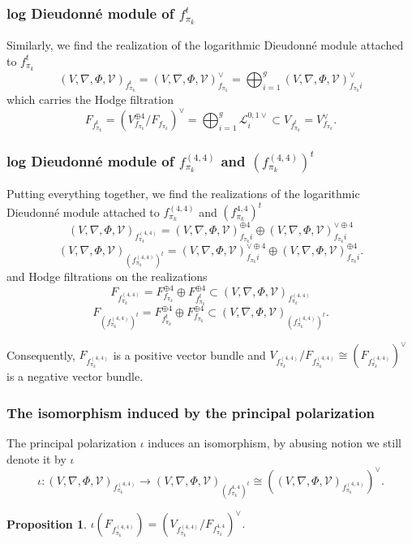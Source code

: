 \documentclass[12pt,twoside]{book}
\theoremstyle{plain}
\newtheorem{proposition}[proposition]{Proposition}
\theoremstyle{definition}
\theoremstyle{remark}
\newcommand{\mL}{{\mathcal L}}
\numberwithin{equation}{section}
\begin{document}
\subsubsection{log Dieudonn\'e module of $f^t_{\pi_k}$}
Similarly, we find the realization of the logarithmic Dieudonn\'e module attached to $f_{\pi_k}^t$
$$ (V,\nabla,\Phi,\mathcal V)_{f^t_{\pi_k}}=(V,\nabla,\Phi,\mathcal V)^\vee_{f_{\pi_k}}
=\bigoplus_{i=1}^g(V,\nabla,\Phi,\mathcal V)^\vee_{f_{\pi_k} i}$$
which carries the Hodge filtration
\[ F_{f^t_{\pi_k}} = (V_{f_{\pi_k}}^{\oplus 4}/ F_{f_{\pi_k}})^\vee= \bigoplus_{i=1}^g \mL_i^{0,1\vee} \subset V_{f^t_{\pi_k}} = V^\vee_{f_{\pi_k}} .\]

\subsubsection{log Dieudonn\'e module of $f^{(4,4)}_{\pi_k}$ and $(f^{(4,4)}_{\pi_k})^t$}
Putting everything together, we find the realizations of the logarithmic Dieudonn\'e module attached to $f^{(4,4)}_{\pi_k}$ and $(f^{4,4}_{\pi_k})^t$
\[(V,\nabla,\Phi,\mathcal V)_{f^{(4,4)}_{\pi_k}} = (V,\nabla,\Phi,\mathcal V)_{f_{\pi_k}i}^{\oplus 4} \oplus (V,\nabla,\Phi,\mathcal V)_{f_{\pi_k}i}^{\vee \oplus 4}\]
\[(V,\nabla,\Phi,\mathcal V)_{(f^{(4,4)}_{\pi_k})^t} = (V,\nabla,\Phi,\mathcal V)_{f_{\pi_k}i}^{\vee \oplus 4} \oplus (V,\nabla,\Phi,\mathcal V)_{f_{\pi_k}i}^{\oplus 4}.\]
and Hodge filtrations on the realizations
\[F_{f^{(4,4)}_{\pi_k}} = F_{f_{\pi_k}}^{\oplus 4} \oplus F_{f^t_{\pi_k}}^{\oplus 4} \subset (V,\nabla,\Phi,\mathcal V)_{f^{(4,4)}_{\pi_k}}\]
\[F_{(f^{(4,4)}_{\pi_k})^t} =F_{f^t_{\pi_k}}^{\oplus 4} \oplus F_{f_{\pi_k}}^{\oplus 4} \subset (V,\nabla,\Phi,\mathcal V)_{(f^{(4,4)}_{\pi_k})^t}.\]

Consequently, $F_{f^{(4,4)}_{\pi_k}}$ is a positive vector bundle and $V_{f^{(4,4)}_{\pi_k}}/F_{f^{(4,4)}_{\pi_k}}\cong \left(F_{f^{(4,4)}_{\pi_k}}\right)^\vee$ is a negative vector bundle.

\subsubsection{The isomorphism induced by the principal polarization}
The principal polarization $\iota$ induces an isomorphism, by abusing notion we still denote it by $\iota$
\[\iota: (V,\nabla,\Phi,\mathcal V)_{f^{(4,4)}_{\pi_k}} \rightarrow (V,\nabla,\Phi,\mathcal V)_{(f^{4,4}_{\pi_k})^t}\cong \left((V,\nabla,\Phi,\mathcal V)_{f^{(4,4)}_{\pi_k}}\right)^\vee.\]
\begin{proposition} \label{thm_polarization_and_filtration}
$\iota(F_{f^{(4,4)}_{\pi_k}}) = (V_{f^{(4,4)}_{\pi_k}}/F_{f^{4,4}_{\pi_k}})^\vee$.
\end{proposition}
\end{document}
